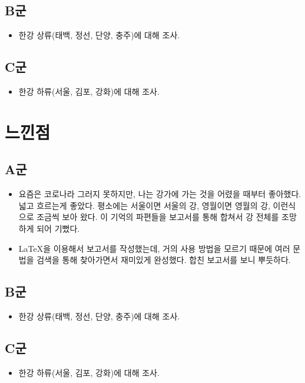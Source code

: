 \documentclass[chapter, oneside]{oblivoir}
\begin{document}
\subsection{B군}
\begin{itemize}
    \item 한강 상류(태백, 정선, 단양, 충주)에 대해 조사.
\end{itemize}
\subsection{C군}
\begin{itemize}
    \item 한강 하류(서울, 김포, 강화)에 대해 조사.
\end{itemize}


\section{느낀점}
\subsection{A군}
\begin{itemize}
    \item 요즘은 코로나라 그러지 못하지만, 나는 강가에 가는 것을 어렸을 때부터 좋아했다. 넓고 흐르는게 좋았다. 평소에는 서울이면 서울의 강, 영월이면 영월의 강, 이런식으로 조금씩 보아 왔다. 이 기억의 파편들을 보고서를 통해 합쳐서 강 전체를 조망하게 되어 기뻤다.
    \item LaTeX을 이용해서 보고서를 작성했는데, 거의 사용 방법을 모르기 때문에 여러 문법을 검색을 통해 찾아가면서 재미있게 완성했다. 합친 보고서를 보니 뿌듯하다.
\end{itemize}
\subsection{B군}
\begin{itemize}
    \item 한강 상류(태백, 정선, 단양, 충주)에 대해 조사.
\end{itemize}
\subsection{C군}
\begin{itemize}
    \item 한강 하류(서울, 김포, 강화)에 대해 조사.
\end{itemize}
\end{document}
